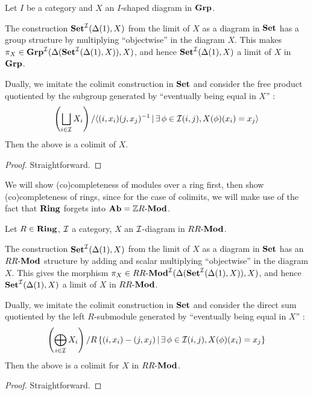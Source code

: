 \begin{prop}
  
  Let $I$ be a category and $X$ an $I$-shaped diagram in $\mathbf{Grp}$.

  The construction $\mathbf{Set}^{\mathcal{I}}(\Delta(1),X)$ from 
  the limit of $X$ as a diagram in $\mathbf{Set}$ has a group structure by
  multiplying ``objectwise'' in the diagram $X$.
  This makes $\pi_X \in \mathbf{Grp}^{\mathcal{I}}(\Delta(\mathbf{Set}^{\mathcal{I}}(\Delta(1),X)),X)$,
  and hence $\mathbf{Set}^{\mathcal{I}}(\Delta(1),X)$ a limit of $X$ in $\mathbf{Grp}$.

  Dually, we imitate the colimit construction in $\mathbf{Set}$ and consider 
  the free product quotiented by the subgroup generated by 
  ``eventually being equal in $X$'' : 
  \[
    \left(\bigsqcup_{i \in\mathcal{I}} X_i\right) /
    \langle(i,x_i)(j,x_j)^{-1} \,|\, \exists\,\phi\in\mathcal{I}(i,j), X(\phi)(x_i) = x_j\rangle
  \]
  Then the above is a colimit of $X$.

\end{prop}
\begin{proof}
  Straightforward. 
\end{proof}

\begin{rmk}
  We will show (co)completeness of modules over a ring first,
  then show (co)completeness of rings,
  since for the case of colimits, 
  we will make use of the fact that $\mathbf{Ring}$ forgets into $\mathbf{Ab} = \mathbb{Z}R\text{-}\mathbf{Mod}$. 
\end{rmk}

\begin{prop}
  
  Let $R \in \mathbf{Ring}$, $\mathcal{I}$ a category, 
  $X$ an $\mathcal{I}$-diagram in $RR\text{-}\mathbf{Mod}$.

  The construction $\mathbf{Set}^{\mathcal{I}}(\Delta(1),X)$ from 
  the limit of $X$ as a diagram in $\mathbf{Set}$ has an $RR\text{-}\mathbf{Mod}$ structure by
  adding and scalar multiplying ``objectwise'' in the diagram $X$.
  This gives the morphism $\pi_X \in RR\text{-}\mathbf{Mod}^{\mathcal{I}}(\Delta(\mathbf{Set}^{\mathcal{I}}(\Delta(1),X)),X)$,
  and hence $\mathbf{Set}^{\mathcal{I}}(\Delta(1),X)$ a limit of $X$ in $RR\text{-}\mathbf{Mod}$.

  Dually, we imitate the colimit construction in $\mathbf{Set}$ and consider 
  the direct sum quotiented by the left $R$-submodule generated by 
  ``eventually being equal in $X$'' : 
  \[
    \left(\bigoplus_{i\in\mathcal{I}} X_i\right) / 
    R\left\{(i,x_i) - (j,x_j) \,|\, \exists\, \phi\in\mathcal{I}(i,j), X(\phi)(x_i) = x_j\right\}
  \]
  Then the above is a colimit for $X$ in $RR\text{-}\mathbf{Mod}$.
\end{prop}
\begin{proof}
  Straightforward.
\end{proof}

